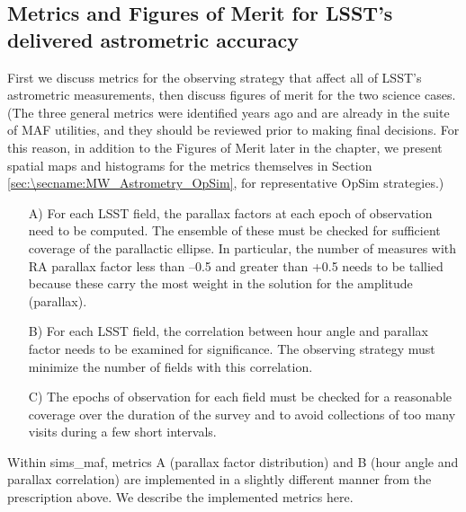 


\subsection{Metrics and Figures of Merit for LSST's delivered astrometric accuracy}
\label{sec:\secname:MW_Astrometry_metrics}


First we discuss metrics for the observing strategy that affect all of
LSST's astrometric measurements, then discuss figures of merit for the
two science cases. (The three general metrics were identified years
ago and are already in the suite of MAF utilities, and they should be
reviewed prior to making final decisions. For this reason, in addition
to the Figures of Merit later in the chapter, we present spatial maps
and histograms for the metrics themselves in Section
\ref{sec:\secname:MW_Astrometry_OpSim}, for representative OpSim
strategies.)

\begin{itemize}
\item[A)] For each LSST field, the parallax factors at each epoch of
observation need to be computed.  The ensemble of these must be checked for
sufficient coverage of the parallactic ellipse.  In particular, the number of
measures with RA parallax factor less than --0.5 and greater than +0.5
needs to be tallied because these carry the most weight in the solution
for the amplitude (parallax).
\item[B)] For each LSST field, 
the correlation between hour angle and parallax factor
needs to be examined for significance.  The observing strategy must minimize
the number of fields with this correlation.
\item[C)] The epochs of observation for each field must be checked for a
reasonable coverage over the duration of the survey and to avoid
collections of too many visits during a few short intervals.
\end{itemize}

Within sims\_maf, metrics A (parallax factor distribution) and B
  (hour angle and parallax correlation) are implemented in a slightly
  different manner from the prescription above. We describe the
  implemented metrics here.

